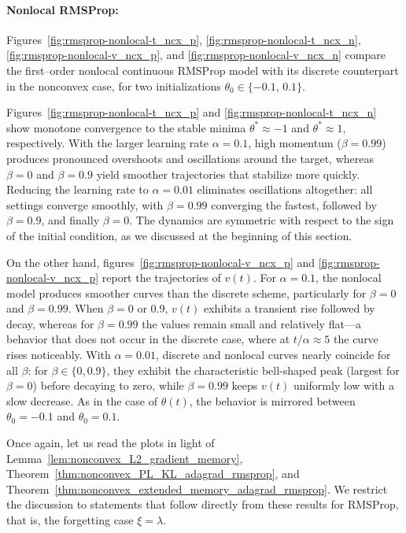 \documentclass{article} %
\begin{document}
\paragraph{Nonlocal RMSProp:} Figures~\ref{fig:rmsprop-nonlocal-t_ncx_p}, \ref{fig:rmsprop-nonlocal-t_ncx_n}, \ref{fig:rmsprop-nonlocal-v_ncx_p}, and \ref{fig:rmsprop-nonlocal-v_ncx_n} compare the first–order nonlocal continuous RMSProp model with its discrete counterpart in the nonconvex case, for two initializations \(\theta_0\in\{-0.1,\,0.1\}\).

Figures~\ref{fig:rmsprop-nonlocal-t_ncx_p} and \ref{fig:rmsprop-nonlocal-t_ncx_n} show monotone convergence to the stable minima \(\theta^*\approx -1\) and \(\theta^*\approx 1\), respectively. With the larger learning rate \(\alpha=0.1\), high momentum (\(\beta=0.99\)) produces pronounced overshoots and oscillations around the target, whereas \(\beta=0\) and \(\beta=0.9\) yield smoother trajectories that stabilize more quickly. Reducing the learning rate to \(\alpha=0.01\) eliminates oscillations altogether: all settings converge smoothly, with \(\beta=0.99\) converging the fastest, followed by \(\beta=0.9\), and finally \(\beta=0\). The dynamics are symmetric with respect to the sign of the initial condition, as we discussed at the beginning of this section.

On the other hand, figures~\ref{fig:rmsprop-nonlocal-v_ncx_p} and \ref{fig:rmsprop-nonlocal-v_ncx_p} report the trajectories of \(v(t)\). For \(\alpha=0.1\), the nonlocal model produces smoother curves than the discrete scheme, particularly for \(\beta=0\) and \(\beta=0.99\). When \(\beta=0\) or \(0.9\), \(v(t)\) exhibits a transient rise followed by decay, whereas for \(\beta=0.99\) the values remain small and relatively flat—a behavior that does not occur in the discrete case, where at \(t/\alpha \approx 5\) the curve rises noticeably. With \(\alpha=0.01\), discrete and nonlocal curves nearly coincide for all \(\beta\): for \(\beta\in\{0,0.9\}\), they exhibit the characteristic bell-shaped peak (largest for \(\beta=0\)) before decaying to zero, while \(\beta=0.99\) keeps \(v(t)\) uniformly low with a slow decrease. As in the case of \(\theta(t)\), the behavior is mirrored between \(\theta_0=-0.1\) and \(\theta_0=0.1\).

Once again, let us read the plots in light of Lemma~\ref{lem:nonconvex_L2_gradient_memory}, Theorem~\ref{thm:nonconvex_PL_KL_adagrad_rmsprop}, and Theorem~\ref{thm:nonconvex_extended_memory_adagrad_rmsprop}. We restrict the discussion to statements that follow directly from these results for RMSProp, that is, the forgetting case $\xi=\lambda$. 
\end{document}
